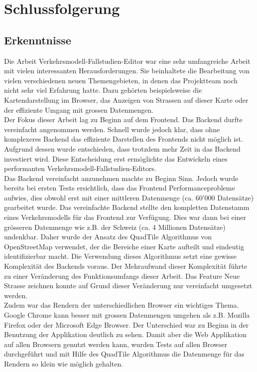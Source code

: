 \chapter{Schlussfolgerung}
\section{Erkenntnisse}
Die Arbeit \glqq{}Verkehrsmodell-Fallstudien-Editor\grqq{} war eine sehr umfangreiche Arbeit mit vielen interessanten Herausforderungen. Sie beinhaltete die Bearbeitung von vielen verschiedenen neuen Themengebieten, in denen das Projektteam noch nicht sehr viel Erfahrung hatte. Dazu gehörten beispielsweise die Kartendarstellung im Browser, das Anzeigen von Strassen auf dieser Karte oder der effiziente Umgang mit grossen Datenmengen.\\
Der Fokus dieser Arbeit lag zu Beginn auf dem Frontend. Das Backend durfte vereinfacht angenommen werden. Schnell wurde jedoch klar, dass ohne komplexeres Backend das effiziente Darstellen des Frontends nicht möglich ist. Aufgrund dessen wurde entschieden, dass trotzdem mehr Zeit in das Backend investiert wird. Diese Entscheidung erst ermöglichte das Entwickeln eines performanten Verkehrsmodell-Fallstudien-Editors.\\
Das Backend vereinfacht anzunehmen machte zu Beginn Sinn. Jedoch wurde bereits bei ersten Tests ersichtlich, dass das Frontend Performanceprobleme aufwies, dies obwohl erst mit einer mittleren Datenmenge (ca. 60'000 Datensätze) gearbeitet wurde. Das vereinfachte Backend stellte den kompletten Datenstamm eines Verkehrsmodells für das Frontend zur Verfügung. Dies war dann bei einer grösseren Datenmenge wie z.B. der Schweiz (ca. 4 Millionen Datensätze) undenkbar. Daher wurde der Ansatz des QuadTile Algorithmus von OpenStreetMap \cite{OSMQuadTiles} verwendet, der die Bereiche einer Karte aufteilt und eindeutig identifizierbar macht. Die Verwendung dieses Algorithmus setzt eine gewisse Komplexität des Backends voraus. Der Mehraufwand dieser Komplexität führte zu einer Veränderung des Funktionsumfangs dieser Arbeit. Das Feature \glqq{}Neue Strasse zeichnen\grqq{} konnte auf Grund dieser Veränderung nur vereinfacht umgesetzt werden.\\
Zudem war das Rendern der unterschiedlichen Browser ein wichtiges Thema.
Google Chrome kann besser mit grossen Datenmengen umgehen als z.B. Mozilla Firefox oder der Microsoft Edge Browser. Der Unterschied war zu Beginn in der Benutzung der Applikation deutlich zu sehen. Damit aber die Web Applikation auf allen Browsern genutzt werden kann, wurden Tests auf allen Browser durchgeführt und mit Hilfe des QuadTile Algorithmus die Datenmenge für das Rendern so klein wie möglich gehalten.\\
